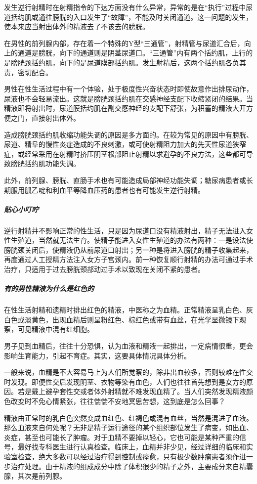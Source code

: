 发生逆行射精时在射精指令的下达方面没有什么异常，异常的是在“执行”过程中尿道括约肌或通往膀胱的入口发生了“故障”，不能及时关闭通道。这一问题的发生，使本来应当射出体外的精液去了不该去的膀胱。

在男性的前列腺内部，存在着一个特殊的Y型“三通管”，射精管与尿道汇合后，向上的通道是膀胱，向下的通道则是阴茎尿道口。“三通管”内有两个括约肌，上行的是膀胱颈括约肌，向下的是尿道膜部括约肌。发生射精后，这两个括约肌各负其责，密切配合。

男性在性生活过程中有一个体验，处于极度性兴奋状态时即使故意作出排尿动作，尿液也不会轻易流出。这就是膀胱颈括约肌在交感神经支配下收缩紧闭的结果。当精液即将射出时，尿道膜括约肌在副交感神经的支配下舒张，为积蓄的精液大开方便之门，直接射出体外。

造成膀胱颈括约肌收缩功能失调的原因是多方面的。在较为常见的原因中有膀胱、尿道、精阜的慢性炎症造成的不良刺激，或可使射精阻力加大的先天性尿道狭窄症，或经常采用在射精时挤压阴茎根部阻止射精以求避孕的不良方法，这些都可导致膀胱括约肌功能失调。

此外，前列腺、膀胱、直肠手术也有可能造成局部神经功能失调；糖尿病患者或长期服用胍乙啶和利血平等降血压药的患者也有可能发生逆行射精。

\subparagraph{贴心小叮咛}

逆行射精并不影响正常的性生活，只是因为尿道口没有精液射出，精子无法进入女性生殖道，当然就无法生育。使精子能进入女性生殖道的办法有两种：一是设法使膀胱颈关闭后，使精液仍从前尿道口射出；另一种是将进入膀胱的精子收集起来，再度通过人工授精方法注入女方子宫颈内。前一种恢复顺行射精的办法可通过手术治疗，只适用于过去膀胱颈部动过手术以致现在关闭不紧的患者。

\subparagraph{有的男性精液为什么是红色的}

在性生活射精和遗精时排出红色的精液，中医称之为血精。正常精液呈乳白色、灰白色或淡黄色，出现血精后则呈粉红色、棕红色或带有血丝，在光学显微镜下观察，可见精液中混有红细胞。

男子见到血精后，往往十分恐惧，认为血液和精液一起排出，一定病情很重，更会影响生育能力，引起不育症。其实，这要具体情况具体分析。

一般来说，血精是不大容易马上为人们所觉察的，除非出血较多，否则较难在性交时发现。即便性交后发现阴茎、衣物等染有血色，人们也往往首先想到是女方的原因。若是戴上避孕套性交或者体外射精就不难发现血精了。当人们突然发现精液颜色改变时不免心情紧张，往往惴惴不安地冥思苦想，这到底是怎么回事？

精液由正常时的乳白色突然变成血红色、红褐色或混有血丝，当然是混进了血液。那么血液来自何处呢？无非是精子运行途径的某个组织部位发生了病变，如出血、炎症，甚至也可能长了肿瘤。对于血精不要掉以轻心，它也可能是某种严重的信号，最好找专科医生进行认真检查。临床上，血精并非少见，经过详细的临床和实验室检查，绝大多数可以经过治疗得到控制或痊愈，只有极少数肿瘤患者须作进一步治疗处理。由于精液的组成成分中除了体积很少的精子之外，主要成分来自精囊腺，其次是前列腺。

